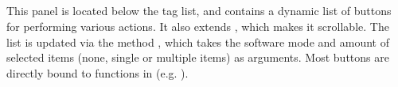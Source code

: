 \subsection{}
\def\kapitelautor{Erik Ritschl}

This panel is located below the tag list, and contains a dynamic list of
buttons for performing various actions. It also extends
, which makes it scrollable. The list is updated via
the method , which takes the software mode and amount of
selected items (none, single or multiple items) as arguments. Most buttons are
directly bound to functions in  (e.g.
).
